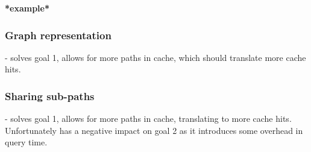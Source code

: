 \textbf{*example*}

\subsubsection{Graph representation} - solves goal 1, allows for more paths in cache, which should translate more cache hits.

\subsubsection{Sharing sub-paths} - solves goal 1, allows for more paths in cache, translating to more cache hits. Unfortunately has a negative impact on goal 2 as it introduces some overhead in query time.

